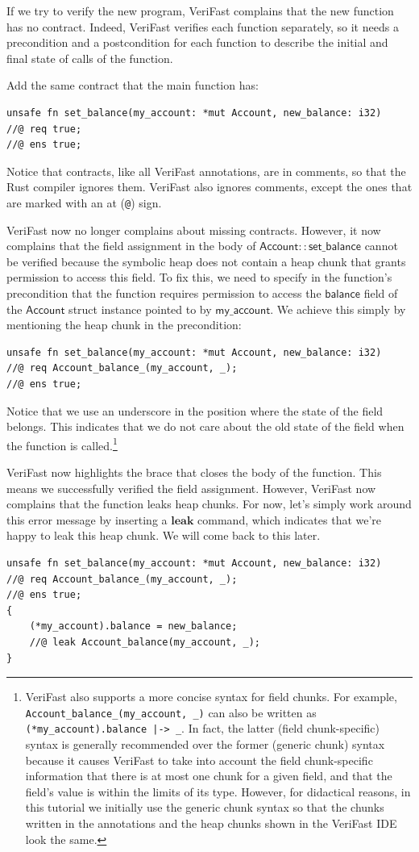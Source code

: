 \documentclass{article}
\begin{document}
If we try to verify the new program, VeriFast complains that
the new function has no contract. Indeed, VeriFast verifies
each function separately, so it needs a precondition and a
postcondition for each function to describe the initial and
final state of calls of the function.

Add the same contract that the main function has:
\begin{lstlisting}
unsafe fn set_balance(my_account: *mut Account, new_balance: i32)
//@ req true;
//@ ens true;
\end{lstlisting}
Notice that contracts, like all VeriFast annotations, are in
comments, so that the Rust compiler ignores them. VeriFast also
ignores comments, except the ones that are marked with an at
(\verb|@|) sign.

VeriFast now no longer complains about missing contracts.
However, it now complains that the field assignment in the body
of $\mathsf{Account{::}set\_balance}$ cannot be verified because
the symbolic heap does not contain a heap chunk that grants
permission to access this field. To fix this, we need to
specify in the function's precondition that the function
requires permission to access the $\mathsf{balance}$ field of
the $\mathsf{Account}$ struct instance pointed to by
$\mathsf{my\_account}$. We achieve this simply by mentioning the
heap chunk in the precondition:
\begin{lstlisting}
unsafe fn set_balance(my_account: *mut Account, new_balance: i32)
//@ req Account_balance_(my_account, _);
//@ ens true;
\end{lstlisting}
Notice that we use an underscore in the position where the
state of the field belongs. This indicates that we do not care
about the old state of the field when the function is
called.\footnote{VeriFast also supports a more concise syntax
for field chunks. For example,
\lstinline!Account_balance_(my_account, _)! can also be written as
\lstinline!(*my_account).balance |-> _!.
In fact, the latter (field chunk-specific) syntax is generally recommended
over the former (generic chunk) syntax because it causes
VeriFast to take into account the field chunk-specific information that there is at most one
chunk for a given field, and that the field's value is within the limits of
its type. However, for didactical reasons, in this tutorial we initially use the generic
chunk syntax so that the chunks written in the annotations and the heap chunks shown in the VeriFast IDE look the same.}

VeriFast now highlights the brace that closes the body of the
function. This means we successfully verified the field
assignment. However, VeriFast now complains that the function
leaks heap chunks. For now, let's simply work around this error
message by inserting a $\mathbf{leak}$ command, which indicates
that we're happy to leak this heap chunk. We will come back to
this later.
\begin{lstlisting}
unsafe fn set_balance(my_account: *mut Account, new_balance: i32)
//@ req Account_balance_(my_account, _);
//@ ens true;
{
    (*my_account).balance = new_balance;
    //@ leak Account_balance(my_account, _);
}
\end{lstlisting}
\end{document}
